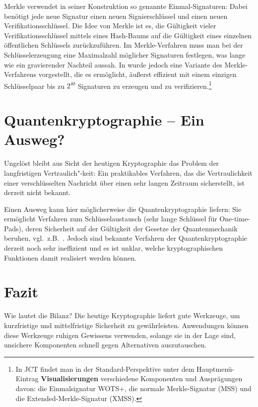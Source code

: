 \begin{refsegment}
Merkle verwendet in seiner Konstruktion so genannte Einmal-Signaturen:
Dabei benötigt jede neue Signatur einen neuen Signierschlüssel und einen
neuen Verifikationsschlüssel. Die Idee von Merkle ist es, die Gültigkeit
vieler Verifikationsschlüssel mittels eines Hash-Baums auf die
Gültigkeit eines einzelnen öffentlichen Schlüssels zurückzuführen. Im
Merkle-Verfahren muss man bei der Schlüsselerzeugung eine Maximalzahl
möglicher Signaturen festlegen, was lange wie ein gravierender Nachteil
aussah. In \cite{buchmann/coronado/dahmen/doering/klintsevich:2006}
wurde jedoch eine Variante des Merkle-Verfahrens vorgestellt, die es
ermöglicht, äußerst effizient mit einem einzigen Schlüsselpaar bis zu
$2^{40}$ Signaturen zu erzeugen und zu verifizieren.\footnote{%
  In JCT findet man in der Standard-Perspektive
  unter dem Hauptmenü-Eintrag {\bf Visualisierungen} verschiedene
  Komponenten und Ausprägungen davon: die Einmalsignatur WOTS+,
  die normale Merkle-Signatur (MSS) und die Extended-Merkle-Signatur
  (XMSS).
}


\section{Quantenkryptographie -- Ein Ausweg?}%
\label{sec:Quantenkryptographie}

Ungelöst bleibt aus Sicht der heutigen Kryptographie das Problem der
langfristigen Vertraulich"-keit: Ein praktikables Verfahren, das die
Vertraulichkeit einer verschlüsselten Nachricht über einen sehr langen
Zeitraum sicherstellt, ist derzeit nicht bekannt.

Einen Ausweg kann hier möglicherweise die Quantenkryptographie liefern:
Sie ermöglicht Verfahren zum Schlüsselaustausch (sehr lange Schlüssel
für One-time-Pads), deren Sicherheit auf der Gültigkeit
der Gesetze der Quantenmechanik beruhen, vgl.\ z.B.\
\cite{bennett/brassard:1984b}. Jedoch sind bekannte Verfahren der
Quantenkryptographie derzeit noch sehr ineffizient und es ist unklar,
welche kryptographischen Funktionen damit realisiert werden können.


\section{Fazit}
\label{sec:fazit}

Wie lautet die Bilanz? Die heutige Kryptographie
liefert gute Werkzeuge, um kurzfristige und mittelfristige
Sicherheit zu gewährleisten. Anwendungen können diese
Werkzeuge ruhigen Gewissens verwenden, solange sie in
der Lage sind, unsichere Komponenten schnell gegen
Alternativen auszutauschen.


\end{refsegment}
